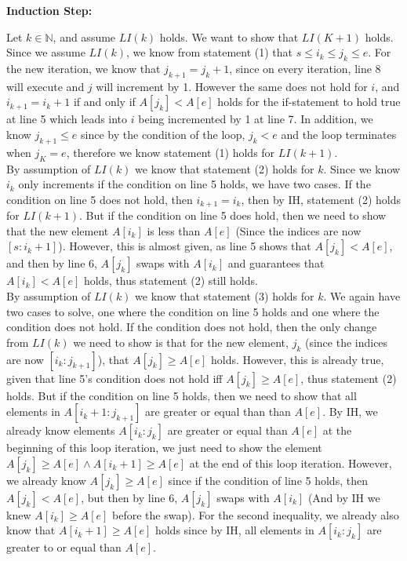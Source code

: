 \documentclass[20pt]{article}
\begin{document}
\noindent
\textbf{Induction Step: }\\
\begin{text}
    Let $k \in \mathbb{N}$, and assume $LI(k)$ holds. We want to show that $LI(K+1)$ holds. Since we assume $LI(k)$, we know from statement (1) that $s \leq i_k \leq j_k \leq e$. For the new iteration, we know that $j_{k+1} = j_{k} + 1$, since on every iteration, line 8 will execute and $j$ will increment by 1. However the same does not hold for $i$, and $i_{k+1} = i_{k} + 1$ if and only if $A[j_k] < A[e]$ holds for the if-statement to hold true at line 5 which leads into $i$ being incremented by 1 at line 7. In addition, we know $j_{k+1} \leq e$ since by the condition of the loop, $j_k < e$ and the loop terminates when $j_K = e$, therefore we know statement (1) holds for $LI(k+1)$.\\
    
    \noindent
    By assumption of $LI(k)$ we know that statement (2) holds for $k$. Since we know $i_k$ only increments if the condition on line 5 holds, we have two cases. If the condition on line 5 does not hold, then $i_{k+1} = i_k$, then by IH, statement (2) holds for $LI(k+1)$. But if the condition on line 5 does hold, then we need to show that the new element $A[i_k]$ is less than $A[e]$ (Since the indices are now $[s:i_k+1]$). However, this is almost given, as line 5 shows that $A[j_k] < A[e]$, and then by line 6, $A[j_k]$ swaps with $A[i_k]$ and guarantees that $A[i_k] < A[e]$ holds, thus statement (2) still holds.\\
    
    \noindent
    By assumption of $LI(k)$ we know that statement (3) holds for $k$. We again have two cases to solve, one where the condition on line 5 holds and one where the condition does not hold. If the condition does not hold, then the only change from $LI(k)$ we need to show is that for the new element, $j_k$ (since the indices are now $[i_k:j_{k+1}]$), that $A[j_k] \geq A[e]$ holds. However, this is already true, given that line 5's condition does not hold iff $A[j_k] \geq A[e]$, thus statement (2) holds. But if the condition on line 5 holds, then we need to show that all elements in $A[i_{k} + 1:j_{k+1}]$ are greater or equal than than $A[e]$. By IH, we already know elements $A[i_{k}:j_k]$ are greater or equal than $A[e]$ at the beginning of this loop iteration, we just need to show the element $A[j_k] \geq A[e] \land A[i_k + 1] \geq A[e]$ at the end of this loop iteration. However, we already know $A[j_k] \geq A[e]$ since if the condition of line 5 holds, then $A[j_k] < A[e]$, but then by line 6, $A[j_k]$ swaps with $A[i_k]$ (And by IH we knew $A[i_k] \geq A[e]$ before the swap). For the second inequality, we already also know that $A[i_k + 1] \geq A[e]$ holds since by IH, all elements in $A[i_{k}:j_k]$ are greater to or equal than $A[e]$.\\
\end{text}
\end{document}
